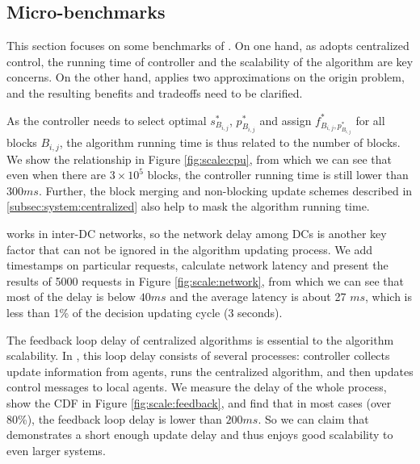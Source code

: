 
\subsection{Micro-benchmarks}
\label{subsec:evaluation:benchmarks}

This section focuses on some benchmarks of \name. On one hand, as \name adopts centralized control, the running time of controller and the scalability of the algorithm are key concerns. On the other hand, \name applies two approximations on the origin problem, and the resulting benefits and tradeoffs need to be clarified.


 As the controller needs to select optimal $s_{B_{i,j}}^*$, $p_{B_{i,j}}^*$ and assign $f^*_{B_{i,j},p_{B_{i,j}}^*}$ for all blocks $B_{i,j}$, the algorithm running time is thus related to the number of blocks. We show the relationship in Figure \ref{fig:scale:cpu}, from which we can see that even when there are $3\times 10^5$ blocks, the controller running time is still lower than $300ms$. Further, the block merging and non-blocking update schemes described in \Section\ref{subsec:system:centralized} also help to mask the algorithm running time.

 \name works in inter-DC networks, so the network delay among DCs is another key factor that can not be ignored in the algorithm updating process. We add timestamps on particular requests, calculate network latency and present the results of 5000 requests in Figure \ref{fig:scale:network}, from which we can see that most of the delay is below $40ms$ and the average latency is about 27 $ms$, which is less than 1\% of the decision updating cycle (3 seconds).

 The feedback loop delay of centralized algorithms is essential to the algorithm scalability. In \name, this loop delay consists of several processes: controller collects update information from agents, runs the centralized algorithm, and then updates control messages to local agents. We measure the delay of the whole process, show the CDF in Figure \ref{fig:scale:feedback}, and find that in most cases (over 80\%), the feedback loop delay is lower than $200ms$. So we can claim that \name demonstrates a short enough update delay and thus enjoys good scalability to even larger systems.

